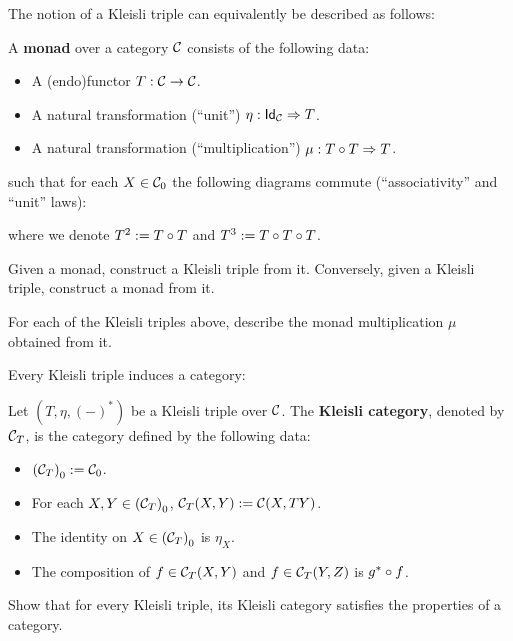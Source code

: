 The notion of a Kleisli triple can equivalently be described  as follows:
\begin{dfn}\label{def:monad}
A \textbf{monad} over a category $\CC$ consists of the following data:
\begin{itemize}
\item A (endo)functor $T:\CC\to\CC$.
\item A natural transformation (``unit'') $\NatTrans{\eta}{\Id[\CC]}{T}$.
\item A natural transformation (``multiplication'') $\NatTrans{\mu}{\co{T}{T}}{T}$.
\end{itemize}
such that for each $X\in\Ob{\CC}$ the following diagrams commute (``associativity'' and ``unit'' laws):
\begin{center}
\quad
{}

\end{center}
where we denote $T^2 := \co{T}{T}$ and $T^3 := \co{T}{\co{T}{T}}$.
\end{dfn}

\begin{exer} Given a monad, construct a Kleisli triple from it.
Conversely, given a Kleisli triple, construct a monad from it.
\end{exer}

\begin{exer}
  For each of the Kleisli triples above, describe the monad multiplication $\mu$ obtained from it.
\end{exer}

Every Kleisli triple induces a category:
\begin{dfn} Let $(T,\eta, (-)^{*})$ be a Kleisli triple over $\CC$. The \textbf{Kleisli category}, denoted by $\CC_{T}$, is the category defined by the following data:
\begin{itemize}
\item $\Ob{(\CC_T)} := \Ob{\CC}$.
\item For each $X,Y\in\Ob{(\CC_T)}$, $\CHom{\CC_T}{X}{Y} := \CHom{\CC}{X}{TY}$.
\item The identity on $X\in\Ob{(\CC_T)}$ is $\eta_X$.
\item The composition of $f\in \CHom{\CC_T}{X}{Y}$ and $f\in \CHom{\CC_T}{Y}{Z}$ is $\co{f}{g^{*}}$.
\end{itemize}
\end{dfn}

\begin{exer} Show that for every Kleisli triple, its Kleisli category satisfies the properties of a category.
\end{exer}


